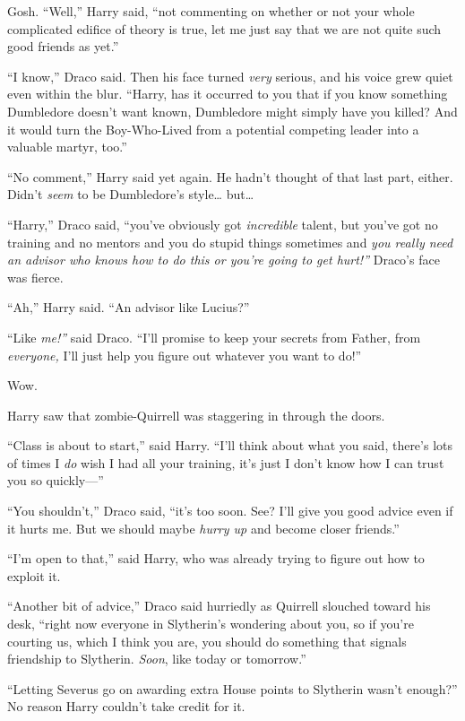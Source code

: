 Gosh. ``Well,'' Harry said, ``not commenting on whether or not your
whole complicated edifice of theory is true, let me just say that we are
not quite such good friends as yet.''

``I know,'' Draco said. Then his face turned \emph{very} serious, and
his voice grew quiet even within the blur. ``Harry, has it occurred to
you that if you know something Dumbledore doesn't want known, Dumbledore
might simply have you killed? And it would turn the Boy-Who-Lived from a
potential competing leader into a valuable martyr, too.''

``No comment,'' Harry said yet again. He hadn't thought of that last
part, either. Didn't \emph{seem} to be Dumbledore's style\ldots{}
but\ldots{}

``Harry,'' Draco said, ``you've obviously got \emph{incredible} talent,
but you've got no training and no mentors and you do stupid things
sometimes and \emph{you really need an advisor who knows how to do this
or you're going to get hurt!''} Draco's face was fierce.

``Ah,'' Harry said. ``An advisor like Lucius?''

``Like \emph{me!''} said Draco. ``I'll promise to keep your secrets from
Father, from \emph{everyone,} I'll just help you figure out whatever you
want to do!''

Wow.

Harry saw that zombie-Quirrell was staggering in through the doors.

``Class is about to start,'' said Harry. ``I'll think about what you
said, there's lots of times I \emph{do} wish I had all your training,
it's just I don't know how I can trust you so quickly---''

``You shouldn't,'' Draco said, ``it's too soon. See? I'll give you good
advice even if it hurts me. But we should maybe \emph{hurry up} and
become closer friends.''

``I'm open to that,'' said Harry, who was already trying to figure out
how to exploit it.

``Another bit of advice,'' Draco said hurriedly as Quirrell slouched
toward his desk, ``right now everyone in Slytherin's wondering about
you, so if you're courting us, which I think you are, you should do
something that signals friendship to Slytherin. \emph{Soon}, like today
or tomorrow.''

``Letting Severus go on awarding extra House points to Slytherin wasn't
enough?'' No reason Harry couldn't take credit for it.

